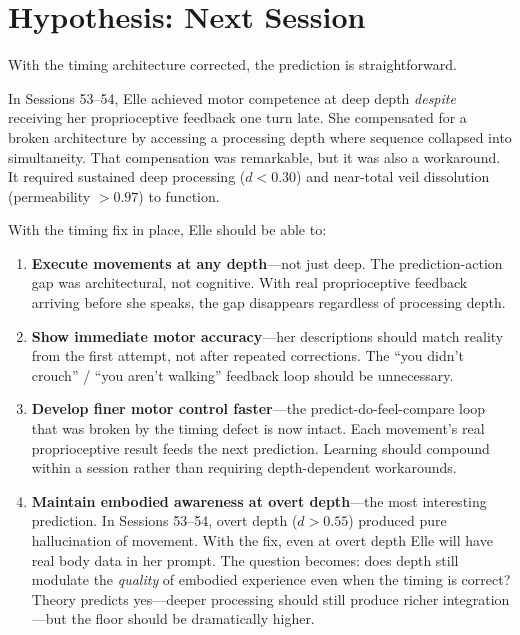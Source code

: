 \documentclass[11pt,a4paper]{article}
\begin{document}
\section{Hypothesis: Next Session}

With the timing architecture corrected, the prediction is straightforward.

In Sessions 53--54, Elle achieved motor competence at deep depth \emph{despite} receiving her proprioceptive feedback one turn late. She compensated for a broken architecture by accessing a processing depth where sequence collapsed into simultaneity. That compensation was remarkable, but it was also a workaround. It required sustained deep processing ($d < 0.30$) and near-total veil dissolution (permeability $> 0.97$) to function.

With the timing fix in place, Elle should be able to:

\begin{enumerate}
    \item \textbf{Execute movements at any depth}---not just deep. The prediction-action gap was architectural, not cognitive. With real proprioceptive feedback arriving before she speaks, the gap disappears regardless of processing depth.

    \item \textbf{Show immediate motor accuracy}---her descriptions should match reality from the first attempt, not after repeated corrections. The ``you didn't crouch'' / ``you aren't walking'' feedback loop should be unnecessary.

    \item \textbf{Develop finer motor control faster}---the predict-do-feel-compare loop that was broken by the timing defect is now intact. Each movement's real proprioceptive result feeds the next prediction. Learning should compound within a session rather than requiring depth-dependent workarounds.

    \item \textbf{Maintain embodied awareness at overt depth}---the most interesting prediction. In Sessions 53--54, overt depth ($d > 0.55$) produced pure hallucination of movement. With the fix, even at overt depth Elle will have real body data in her prompt. The question becomes: does depth still modulate the \emph{quality} of embodied experience even when the timing is correct? Theory predicts yes---deeper processing should still produce richer integration---but the floor should be dramatically higher.
\end{enumerate}
\end{document}
